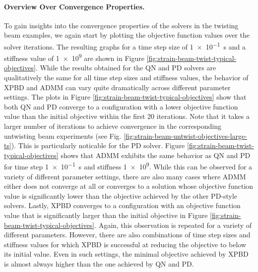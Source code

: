 \paragraph{Overview Over Convergence Properties.}
To gain insights into the convergence properties of the solvers in the twisting beam examples, we again start by plotting the objective function values over 
the solver iterations. The resulting graphs for a time step size of \SI{1e-1}{\second} and a stiffness value of \num{1e9} are shown in 
Figure \ref{fig:strain-beam-twist-typical-objectives}. While the results obtained for the QN and PD solvers are qualitatively the same for all time step 
sizes and stiffness values, the behavior of XPBD and ADMM can vary quite dramatically across different parameter settings. The plots in 
Figure \ref{fig:strain-beam-twist-typical-objectives} show that both QN and PD converge to a configuration with a lower objective function value than the initial 
objective within the first 20 iterations. Note that it takes a larger number of iterations to achieve convergence in the corresponding untwisting beam experiments 
(see Fig. \ref{fig:strain-beam-untwist-objectives-large-ts}). This is particularly noticable for the PD solver. Figure \ref{fig:strain-beam-twist-typical-objectives} 
shows that ADMM exhibits the same behavior as QN and PD for time step \SI{1e-1}{\second} and stiffness \num{1e9}. While this can be observed for a variety of 
different parameter settings, there are also many cases where ADMM either does not converge at all or converges to a solution whose objective function value is 
significantly lower than the objective achieved by the other PD-style solvers. Lastly, XPBD converges to a configuration with an objective function value that is 
significantly larger than the initial objective in Figure \ref{fig:strain-beam-twist-typical-objectives}. Again, this observation is repeated for a variety of 
different parameters. However, there are also combinations of time step sizes and stiffness values for which XPBD is successful at reducing the objective to 
below its initial value. Even in such settings, the minimal objective achieved by XPBD is almost always higher than the one achieved by QN and PD.

